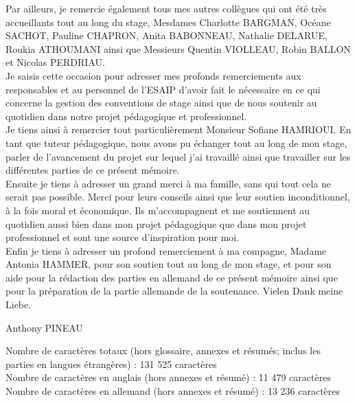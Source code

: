 \documentclass[a4paper, 12pt, french]{article}
\begin{document}
		Par ailleurs, je remercie également tous mes autres collègues qui ont été très accueillants tout au long du stage, Mesdames Charlotte BARGMAN, Océane SACHOT, Pauline CHAPRON, Anita BABONNEAU, Nathalie DELARUE, Roukia ATHOUMANI ainsi que Messieurs Quentin VIOLLEAU, Robin BALLON et Nicolas PERDRIAU.\\

		Je saisis cette occasion pour adresser mes profonds remerciements aux responsables et au personnel de l’ESAIP d’avoir fait le nécessaire en ce qui concerne la gestion des conventions de stage ainsi que de nous soutenir au quotidien dans notre projet pédagogique et professionnel.\\

		Je tiens ainsi à remercier tout particulièrement Monsieur Sofiane HAMRIOUI. En tant que tuteur pédagogique, nous avons pu échanger tout au long de mon stage, parler de l’avancement du projet sur lequel j'ai travaillé ainsi que travailler sur les différentes parties de ce présent mémoire.\\

		Ensuite je tiens à adresser un grand merci à ma famille, sans qui tout cela ne serait pas possible. Merci pour leurs conseils ainsi que leur soutien inconditionnel, à la fois moral et économique. Ils m’accompagnent et me soutiennent au quotidien aussi bien dans mon projet pédagogique que dans mon projet professionnel et sont une source d’inspiration pour moi.\\

		Enfin je tiens à adresser un profond remerciement à ma compagne, Madame Antonia HAMMER, pour son soutien tout au long de mon stage, et pour son aide pour la rédaction des parties en allemand de ce présent mémoire ainsi que pour la préparation de la partie allemande de la soutenance. Vielen Dank meine Liebe.

		\vspace{\baselineskip}\vspace{\baselineskip}\vspace{\baselineskip}
		\noindent
		Anthony PINEAU

	\newpage

	\normalsize
	
	\tableofcontents

	\vspace{\baselineskip}
	\noindent Nombre de caractères totaux (hors glossaire, annexes et résumés; inclus les parties en langues étrangères) : 131 525 caractères\\
	Nombre de caractères en anglais (hors annexes et résumé) : 11 479 caractères\\
	Nombre de caractères en allemand (hors annexes et résumé) : 13 236 caractères\\
\end{document}
